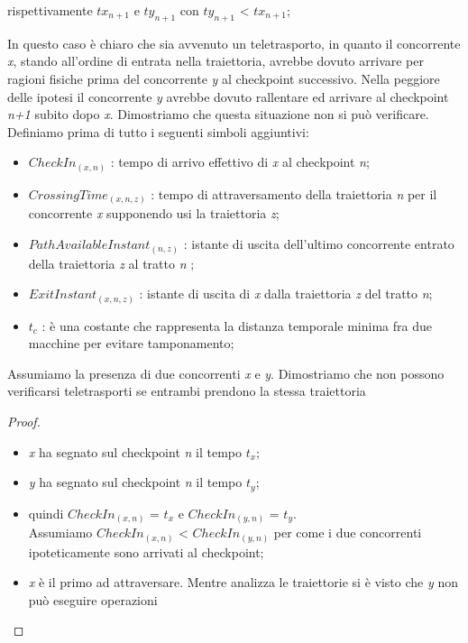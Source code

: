 \begin{itemize}
\begin{itemize}
rispettivamente \emph{$tx_{n+1}$} e \emph{$ty_{n+1}$} con \emph{$ty_{n+1}$} < \emph{$tx_{n+1}$};
\end{itemize}
In questo caso è chiaro che sia avvenuto un teletrasporto, in quanto il concorrente \emph{x}, stando all'ordine di entrata nella
traiettoria, avrebbe dovuto arrivare per ragioni fisiche prima del concorrente \emph{y} al checkpoint successivo. Nella peggiore 
delle ipotesi il concorrente \emph{y} avrebbe dovuto rallentare ed arrivare al checkpoint \emph{n+1} subito dopo \emph{x}. 
Dimostriamo che questa situazione non si può verificare. Definiamo prima di tutto i seguenti simboli aggiuntivi:
\begin{itemize}
\item $CheckIn_{(x,n)}$ : tempo di arrivo effettivo di \emph{x} al checkpoint \emph{n};
\item $CrossingTime_{(x,n,z)}$ : tempo di attraversamento della traiettoria \emph{n} per il concorrente \emph{x} supponendo usi la traiettoria
\emph{z}; 
\item $PathAvailableInstant_{(n,z)}$ : istante di uscita dell'ultimo concorrente entrato della traiettoria \emph{z} al tratto \emph{n} ;
\item $ExitInstant_{(x,n,z)}$ : istante di uscita di \emph{x} dalla traiettoria \emph{z} del tratto \emph{n};
\item $t_c$ : è una costante che rappresenta la distanza temporale minima fra due macchine per evitare tamponamento;
\end{itemize}
Assumiamo la presenza di due concorrenti \emph{x} e \emph{y}. Dimostriamo che non possono verificarsi teletrasporti se entrambi
prendono la stessa traiettoria
\begin{proof}
\begin{itemize}
\item \emph{x} ha segnato sul checkpoint \emph{n} il tempo \emph{$t_x$};
\item \emph{y} ha segnato sul checkpoint \emph{n} il tempo \emph{$t_y$};
\item quindi $CheckIn_{(x,n)}$ = $t_x$ e $CheckIn_{(y,n)}$ = $t_y$. 
\\Assumiamo $CheckIn_{(x,n)}$ < $CheckIn_{(y,n)}$ per come i due concorrenti
ipoteticamente sono arrivati al checkpoint;
\item \emph{x} è il primo ad attraversare. Mentre analizza le traiettorie si è visto che \emph{y} non può eseguire operazioni

\end{itemize}
\end{proof}
\end{itemize}
